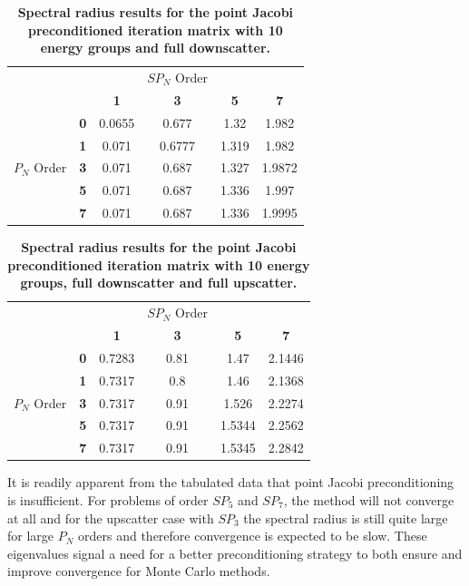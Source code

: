 \begin{table}[h!]
  \begin{center}
    \begin{tabular}{cccccc}\hline\hline
      \multicolumn{1}{c}{}& 
      \multicolumn{1}{c}{}& 
      \multicolumn{1}{c}{}& 
      \multicolumn{1}{c}{$SP_N$ Order}& 
      \multicolumn{1}{c}{}& 
      \multicolumn{1}{c}{} \\
       &   & \textbf{1} & \textbf{3} & \textbf{5} & \textbf{7}  \\
       & \textbf{0} & 0.0655 & 0.677 & 1.32 & 1.982 \\
       & \textbf{1} & 0.071 & 0.6777 & 1.319 & 1.982 \\
      $P_N$ Order & \textbf{3} & 0.071 & 0.687 & 1.327 & 1.9872 \\
       & \textbf{5} & 0.071 & 0.687 & 1.336 & 1.997 \\
       & \textbf{7} & 0.071 & 0.687 & 1.336 & 1.9995 \\
      \hline\hline
    \end{tabular}
  \end{center}
  \caption{\textbf{Spectral radius results for the point Jacobi
      preconditioned iteration matrix with 10 energy groups and full
      downscatter.}}
  \label{tab:group10dspj}
\end{table}
\begin{table}[h!]
  \begin{center}
    \begin{tabular}{cccccc}\hline\hline
      \multicolumn{1}{c}{}& 
      \multicolumn{1}{c}{}& 
      \multicolumn{1}{c}{}& 
      \multicolumn{1}{c}{$SP_N$ Order}& 
      \multicolumn{1}{c}{}& 
      \multicolumn{1}{c}{} \\
       &   & \textbf{1} & \textbf{3} & \textbf{5} & \textbf{7}  \\
       & \textbf{0} & 0.7283 & 0.81 & 1.47 & 2.1446 \\
       & \textbf{1} & 0.7317 & 0.8 & 1.46 & 2.1368 \\
      $P_N$ Order & \textbf{3} & 0.7317 & 0.91 & 1.526 & 2.2274 \\
       & \textbf{5} & 0.7317 & 0.91 & 1.5344 & 2.2562 \\
       & \textbf{7} & 0.7317 & 0.91 & 1.5345 & 2.2842 \\
      \hline\hline
    \end{tabular}
  \end{center}
  \caption{\textbf{Spectral radius results for the point Jacobi
      preconditioned iteration matrix with 10 energy groups, full
      downscatter and full upscatter.}}
  \label{tab:group10uspj}
\end{table}
It is readily apparent from the tabulated data that point Jacobi
preconditioning is insufficient. For problems of order $SP_5$ and
$SP_7$, the method will not converge at all and for the upscatter case
with $SP_3$ the spectral radius is still quite large for large $P_N$
orders and therefore convergence is expected to be slow. These
eigenvalues signal a need for a better preconditioning strategy to
both ensure and improve convergence for Monte Carlo methods.

